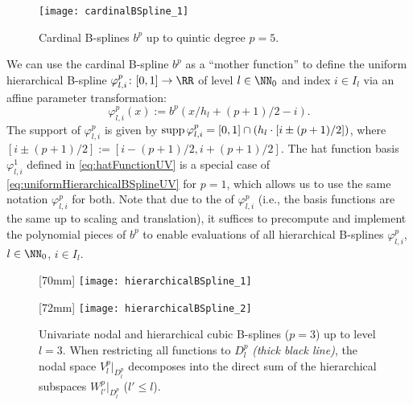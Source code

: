 \begin{figure}
  \texttt{[image: cardinalBSpline\_1]}%
  \caption{Cardinal B-splines $b^p$ up to quintic degree $p = 5$.}%
  \label{fig:cardinalBSpline}
\end{figure}

%
We can use the cardinal B-spline $b^p$ as a ``mother function'' to
define the uniform hierarchical B-spline
$\varphi_{l,i}^p\colon [0, 1] \to \RR$ of level $l \in \NN_0$ and index
$i \in I_l$ via an affine parameter transformation:
\begin{equation}
  \label{eq:uniformHierarchicalBSplineUV}
  \varphi_{l,i}^p(x)
  := b^p(x/h_l + (p+1)/2 - i).
\end{equation}
The support of $\varphi_{l,i}^p$ is given
by $\operatorname{supp} \varphi_{l,i}^p = [0, 1] \cap (h_l \cdot [i \pm (p+1)/2])$,
where $[i \pm (p+1)/2] := [i - (p+1)/2, i + (p+1)/2]$.
The hat function basis $\varphi_{l,i}^1$ defined in
\eqref{eq:hatFunctionUV} is a special case of
\eqref{eq:uniformHierarchicalBSplineUV} for $p = 1$,
which allows us to use the same notation $\varphi_{l,i}^p$ for both.
Note that due to the  of $\varphi_{l,i}^p$
(i.e., the basis functions are the same up to scaling and translation),
it suffices to precompute and implement the polynomial pieces of $b^p$
to enable evaluations of all hierarchical B-splines
$\varphi_{l,i}^p$, $l \in \NN_0$, $i \in I_l$.

\begin{figure}
  [70mm]{%
    \texttt{[image: hierarchicalBSpline\_1]}%
  }%
  \hfill%
  \hfill%
  [72mm]{%
    \texttt{[image: hierarchicalBSpline\_2]}%
  }%
  \caption{%
    Univariate nodal and hierarchical cubic B-splines ($p = 3$)
    up to level $l = 3$.
    When restricting all functions to $D_l^p$ \emph{(thick black line)},
    the nodal space $V_l^p|_{D_l^p}$ decomposes into the direct sum
    of the hierarchical subspaces $W_{l'}^p|_{D_l^p}$ ($l' \le l$).%
  }
  \label{fig:hierarchicalBSpline}
\end{figure}

